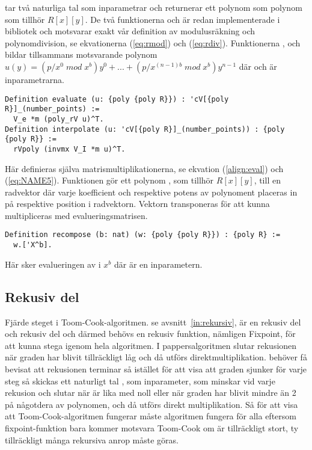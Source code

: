  tar två naturliga tal som inparametrar och returnerar ett polynom som
polynom som tillhör $R[x][y]$. De två funktionerna  och  är
redan implementerade i \ssr bibliotek och motsvarar exakt vår definition av
modulusräkning och polynomdivision, se ekvationerna (\ref{eq:rmod}) och
(\ref{eq:rdiv}). Funktionerna ,  och  bildar
tillsammans motsvarande polynom
$u(y)=(p/x^0\;mod\;x^b)y^0+...+(p/x^{(n-1)b}\;mod\;x^b)y^{n-1}$ där  och
 är inparametrarna.

\begin{lstlisting}
Definition evaluate (u: {poly {poly R}}) : 'cV[{poly R}]_(number_points) :=
  V_e *m (poly_rV u)^T.
Definition interpolate (u: 'cV[{poly R}]_(number_points)) : {poly {poly R}} :=
  rVpoly (invmx V_I *m u)^T.
\end{lstlisting}

Här definieras själva matrismultiplikationerna, se ekvation (\ref{align:eval})
och (\ref{eq:NAME5}). Funktionen  gör ett polynom , som
tillhör $R[x][y]$, till en radvektor där varje koefficient och respektive
potens av polynoment placeras in på respektive position i radvektorn. Vektorn
transponeras för att kunna multipliceras med evalueringsmatrisen.

\begin{lstlisting}
Definition recompose (b: nat) (w: {poly {poly R}}) : {poly R} :=
  w.['X^b].
\end{lstlisting}

Här sker evalueringen av  i $x^b$ där  är en inparametern.

\subsection{Rekusiv del}

Fjärde steget i Toom-Cook-algoritmen. se avsnitt~\ref{in:rekursiv},  är en rekusiv del och
rekusiv del och därmed behövs en rekusiv funktion, nämligen Fixpoint, för att
kunna stega igenom hela algoritmen. I pappersalgoritmen slutar rekusionen när
graden har blivit tillräckligt låg och då utförs direktmultiplikation. \coq
behöver få bevisat att rekusionen terminar så istället för att visa att graden
sjunker för varje steg så skickas ett naturligt tal , som inparameter, som
minskar vid varje rekusion och slutar när  är lika med noll eller när
graden har blivit mindre än 2 på någotdera av polynomen, och då utförs direkt
multiplikation. Så för att visa att Toom-Cook-algoritmen fungerar måste
algoritmen fungera för alla  eftersom fixpoint-funktion bara kommer motsvara
Toom-Cook om  är tillräckligt stort, ty tillräckligt många rekursiva anrop
måste göras.

